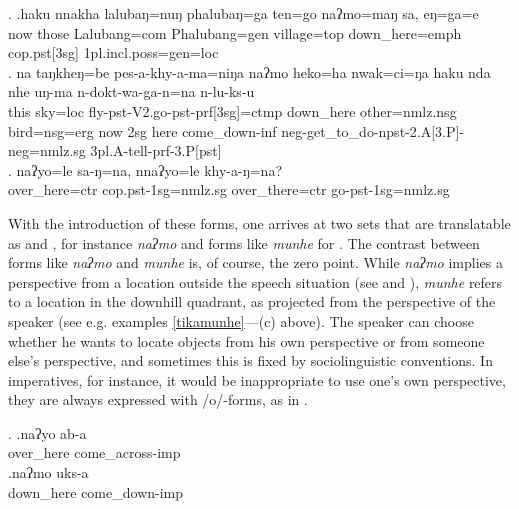 \ex. \ag.haku nnakha lalubaŋ=nuŋ   phalubaŋ=ga    ten=go         naʔmo=maŋ      sa,     eŋ=ga=e\\
now those Lalubang{\sc =com} Phalubang{\sc =gen} village{\sc =top} down\_here{\sc =emph} {\sc cop.pst[3sg]} {\sc 1pl.incl.poss=gen=loc}\\
 
\bg. na   taŋkheŋ=be    pes-a-khy-a-ma=niŋa naʔmo heko=ha nwak=ci=ŋa haku nda nhe uŋ-ma n-dokt-wa-ga-n=na n-lu-ks-u\\
	this sky{\sc =loc} fly{\sc -pst-V2.go-pst-prf[3sg]=ctmp} down\_here other{\sc =nmlz.nsg} bird{\sc =nsg=erg}	now {\sc 2sg} here come\_down{\sc -inf} {\sc neg-}get\_to\_do{\sc -npst-2.A[3.P]-neg=nmlz.sg} 	{\sc 3pl.A}-tell-{\sc prf-3.P[pst]}\\
	 
\bg.	naʔyo=le             sa-ŋ=na,                 nnaʔyo=le             khy-a-ŋ=na?\\
over\_here{\sc =ctr} {\sc cop.pst-1sg=nmlz.sg} over\_there{\sc =ctr} go{\sc -pst-1sg=nmlz.sg}\\
 


With the introduction of these forms, one arrives at two sets that are translatable as  and , for instance \emph{naʔmo}  and forms like  \emph{munhe} for . The  contrast between forms like  \emph{naʔmo}  and  \emph{munhe} is, of course, the zero point. While \emph{naʔmo} implies a perspective from a location outside the speech situation (see \Last and \Next), \emph{munhe} refers to a location in the downhill quadrant, as projected from the perspective of the speaker (see e.g. examples \ref{tikamunhe}—(c) above).  The speaker can choose whether he wants to locate objects from his own perspective or from someone else's perspective, and sometimes this is fixed by sociolinguistic conventions. In imperatives, for instance, it would be inappropriate to use one's own perspective, they are always expressed with /o/-forms, as in \Next. 

\ex. \ag.naʔyo ab-a\\
over\_here come\_across{\sc -imp}\\
\bg.naʔmo uks-a\\
down\_here come\_down{\sc -imp}\\



